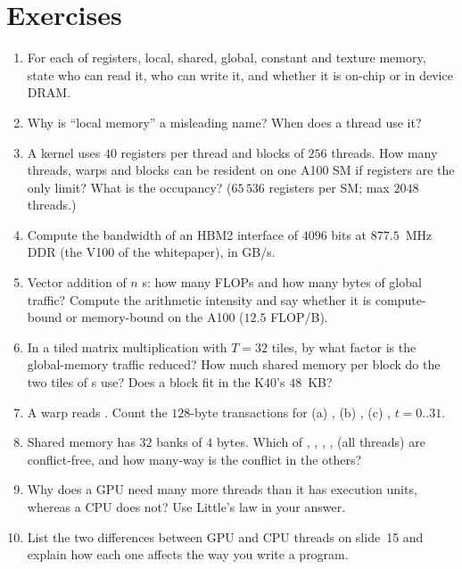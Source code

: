 \section*{Exercises}
\begin{enumerate}[label=\textbf{\thechapter.\arabic*},leftmargin=*]
  \item For each of registers, local, shared, global, constant and texture memory, state who can read it, who can write it, and whether it is on-chip or in device DRAM.
  \item Why is ``local memory'' a misleading name? When does a thread use it?
  \item A kernel uses $40$ registers per thread and blocks of $256$ threads. How many threads, warps and blocks can be resident on one A100 SM if registers are the only limit? What is the occupancy? ($65\,536$ registers per SM; max $2048$ threads.)
  \item Compute the bandwidth of an HBM2 interface of $4096$ bits at $877.5$~MHz DDR (the V100 of the whitepaper), in GB/s.
  \item Vector addition of $n$ s: how many FLOPs and how many bytes of global traffic? Compute the arithmetic intensity and say whether it is compute-bound or memory-bound on the A100 ($12.5$ FLOP/B).
  \item In a tiled matrix multiplication with $T=32$ tiles, by what factor is the global-memory traffic reduced? How much shared memory per block do the two tiles of s use? Does a block fit in the K40's $48$~KB?
  \item A warp reads . Count the $128$-byte transactions for (a) , (b) , (c) , $t=0..31$.
  \item Shared memory has $32$ banks of $4$ bytes. Which of , , , ,  (all threads) are conflict-free, and how many-way is the conflict in the others?
  \item Why does a GPU need many more threads than it has execution units, whereas a CPU does not? Use Little's law in your answer.
  \item List the two differences between GPU and CPU threads on slide~15 and explain how each one affects the way you write a program.
\end{enumerate}

